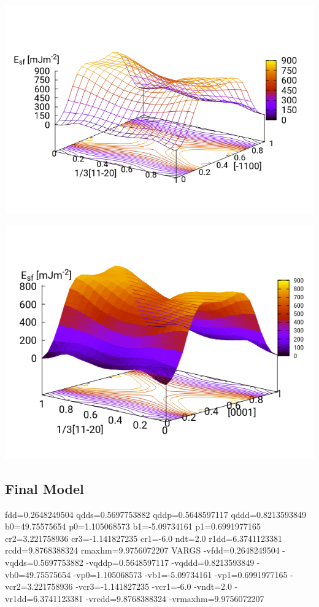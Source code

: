 \documentclass[11pt]{article}
\begin{document}
\begin{enumerate}
\begin{enumerate}
\begin{center}
\includegraphics[width=.9\linewidth]{Images/prismatic_gamma_surface_tbe_15_layers_2019-09-24.png}
\end{center}

\begin{center}
\includegraphics[width=.9\linewidth]{Images/prismatic_gamma_surface_tbe_15_z.png}
\end{center}
\end{enumerate}
\end{enumerate}

\subsection{Final Model}
\label{sec:org02c6b02}


 fdd=0.2648249504 qdds=0.5697753882 qddp=0.5648597117 qddd=0.8213593849 b0=49.75575654 p0=1.105068573 b1=-5.09734161 p1=0.6991977165 cr2=3.221758936 cr3=-1.141827235 cr1=-6.0 ndt=2.0 r1dd=6.3741123381 rcdd=9.8768388324 rmaxhm=9.9756072207 
VARGS
    -vfdd=0.2648249504 -vqdds=0.5697753882 -vqddp=0.5648597117 -vqddd=0.8213593849 -vb0=49.75575654 -vp0=1.105068573 -vb1=-5.09734161 -vp1=0.6991977165 -vcr2=3.221758936 -vcr3=-1.141827235  -vcr1=-6.0 -vndt=2.0 -vr1dd=6.3741123381 -vrcdd=9.8768388324 -vrmaxhm=9.9756072207 
\end{document}
